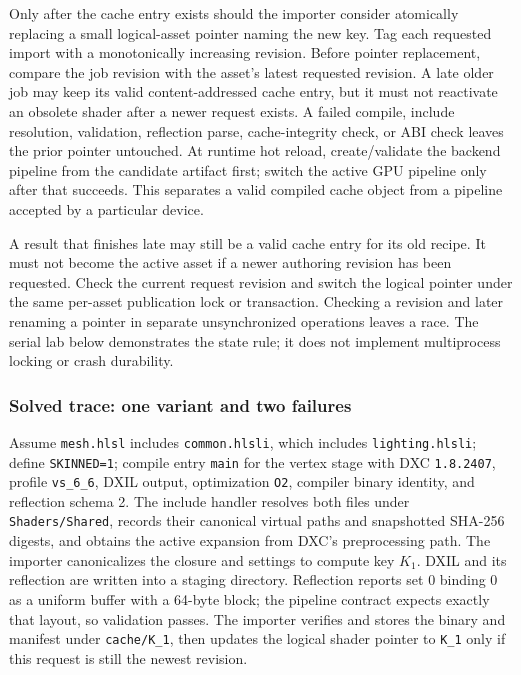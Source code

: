 Only after the cache entry exists should the importer consider atomically replacing a small logical-asset pointer naming the new key. Tag each requested import with a monotonically increasing revision. Before pointer replacement, compare the job revision with the asset's latest requested revision. A late older job may keep its valid content-addressed cache entry, but it must not reactivate an obsolete shader after a newer request exists. A failed compile, include resolution, validation, reflection parse, cache-integrity check, or ABI check leaves the prior pointer untouched. At runtime hot reload, create/validate the backend pipeline from the candidate artifact first; switch the active GPU pipeline only after that succeeds. This separates a valid compiled cache object from a pipeline accepted by a particular device.

A result that finishes late may still be a valid cache entry for its old recipe. It must not become the active asset if a newer authoring revision has been requested. Check the current request revision and switch the logical pointer under the same per-asset publication lock or transaction. Checking a revision and later renaming a pointer in separate unsynchronized operations leaves a race. The serial lab below demonstrates the state rule; it does not implement multiprocess locking or crash durability.

\subsubsection{Solved trace: one variant and two failures}\label{05-engine-i-ch010-solved-trace-one-variant-and-two-failures}

\hypertarget{05-engine-i-ch010-solved-trace-one-variant-and-two-failures}{}

Assume \texttt{mesh.hlsl} includes \texttt{common.hlsli}, which includes \texttt{lighting.hlsli}; define \texttt{SKINNED=1}; compile entry \texttt{main} for the vertex stage with DXC \texttt{1.8.2407}, profile \texttt{vs\_6\_6}, DXIL output, optimization \texttt{O2}, compiler binary identity, and reflection schema 2. The include handler resolves both files under \texttt{Shaders/Shared}, records their canonical virtual paths and snapshotted SHA-256 digests, and obtains the active expansion from DXC's preprocessing path. The importer canonicalizes the closure and settings to compute key \(K_1\). DXIL and its reflection are written into a staging directory. Reflection reports set 0 binding 0 as a uniform buffer with a 64-byte block; the pipeline contract expects exactly that layout, so validation passes. The importer verifies and stores the binary and manifest under \texttt{cache/K\_1}, then updates the logical shader pointer to \texttt{K\_1} only if this request is still the newest revision.

